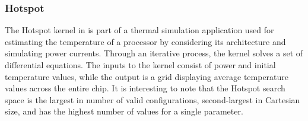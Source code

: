 \subsubsection{Hotspot} \label{subsubsec:evaluation_setup_kernel_hotspot}
The Hotspot kernel in \cite{BenchmarkingSuiteKerneltuners} is part of a thermal simulation application used for estimating the temperature of a processor by considering its architecture and simulating power currents. Through an iterative process, the kernel solves a set of differential equations. The inputs to the kernel consist of power and initial temperature values, while the output is a grid displaying average temperature values across the entire chip. 
It is interesting to note that the Hotspot search space is the largest in number of valid configurations, second-largest in Cartesian size, and has the highest number of values for a single parameter. 



